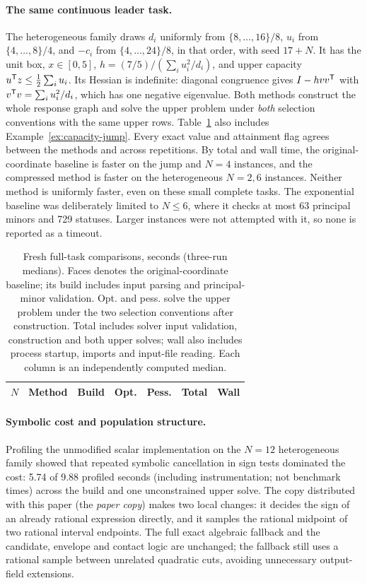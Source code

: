 \paragraph{The same continuous leader task.}
The heterogeneous family draws $d_i$ uniformly from
$\{8,\ldots,16\}/8$, $u_i$ from $\{4,\ldots,8\}/4$, and $-c_i$ from
$\{4,\ldots,24\}/8$, in that order, with seed $17+N$. It has the unit box,
$x\in[0,5]$, $h=(7/5)/(\sum_i u_i^2/d_i)$, and upper capacity
$u^{\mathsf T} z\le\tfrac12\sum_i u_i$. Its Hessian is indefinite: diagonal
congruence gives $I-hvv^{\mathsf T}$ with $v^{\mathsf T} v=\sum_i u_i^2/d_i$, which has one
negative eigenvalue. Both methods construct the whole response graph and solve the upper problem
under \emph{both} selection conventions with the same upper rows.
Table~\ref{tab:full-task} also includes Example~\ref{ex:capacity-jump}.
Every exact value and attainment flag agrees between the methods and across
repetitions. By total and wall time, the original-coordinate baseline is
faster on the jump and $N=4$ instances, and the compressed method is faster
on the heterogeneous $N=2,6$ instances.
Neither method is uniformly faster, even on these small complete tasks.
The exponential baseline was deliberately limited to $N\le6$, where it checks
at most 63 principal minors and 729 statuses. Larger instances were not
attempted with it, so none is reported as a timeout.

\begin{table}[t]
\centering\small
\caption{Fresh full-task comparisons, seconds (three-run medians).
Faces denotes the original-coordinate baseline; its build includes input
parsing and principal-minor validation. Opt. and pess. solve the upper problem
under the two selection conventions after construction.
Total includes solver input validation, construction and both upper solves;
wall also includes process startup, imports and input-file reading.
Each column is an independently computed median.}
\label{tab:full-task}
\begin{tabular}{llrrrrr}\toprule
$N$ & Method & Build & Opt. & Pess. & Total & Wall\\\midrule
\end{tabular}
\end{table}

\paragraph{Symbolic cost and population structure.}
Profiling the unmodified scalar implementation on the $N=12$ heterogeneous
family showed that repeated symbolic cancellation in sign tests dominated the
cost: 5.74 of 9.88 profiled seconds (including instrumentation; not benchmark
times) across the build and one unconstrained upper solve. The copy
distributed with this paper (the \emph{paper copy}) makes two local changes:
it decides the sign of an already
rational expression directly, and it samples the rational midpoint of two
rational interval endpoints. The full exact algebraic fallback and the
candidate, envelope and contact logic are unchanged; the fallback still uses a
rational sample between unrelated quadratic cuts, avoiding unnecessary
output-field extensions.

